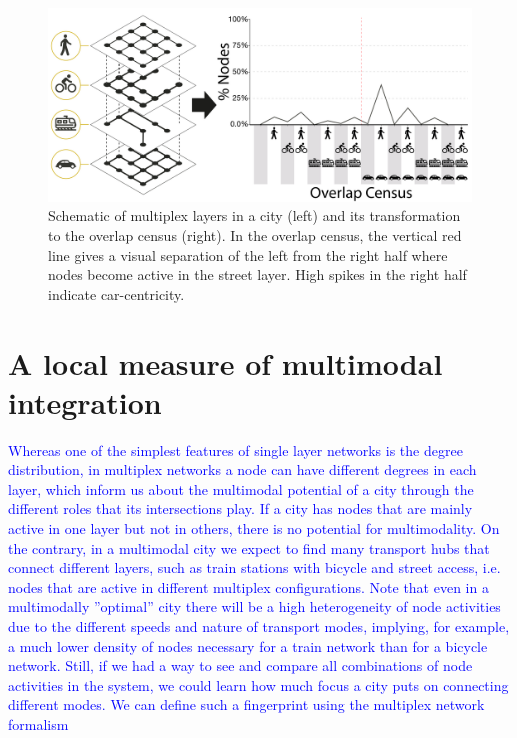 \begin{figure}[th!]
	\centering
	\includegraphics[width=\textwidth]{images/multiplex/SchemaOverlapCensus.png}
	\caption[Schematic overlap census]{
		Schematic of multiplex layers in a city (left) and its transformation to the overlap census (right). In the overlap census, the vertical red line gives a visual separation of the left from the right half where nodes become active in the street layer. High spikes in the right half indicate car-centricity.}
	\label{fig:SchemaOverlapCensus}
\end{figure}

\section{A local measure of multimodal integration}
\textcolor{blue}{Whereas one of the simplest features of single layer networks is the degree distribution, in multiplex networks a node can have different degrees in each layer, which inform us about the multimodal potential of a city through the different roles that its intersections play. If a city has nodes that are mainly active in one layer but not in others, there is no potential for multimodality. On the contrary, in a multimodal city we expect to find many transport hubs that connect different layers, such as train stations with bicycle and street access, i.e. nodes that are active in different multiplex configurations. Note that even in a multimodally ”optimal” city there will be a high heterogeneity of node activities due to the different speeds and nature of transport modes, implying, for example, a much lower density of nodes necessary for a train network than for a bicycle network. Still, if we had a way to see and compare all combinations of node activities in the system, we could learn how much focus a city puts on connecting different modes. We can define such a fingerprint using the multiplex network formalism}

